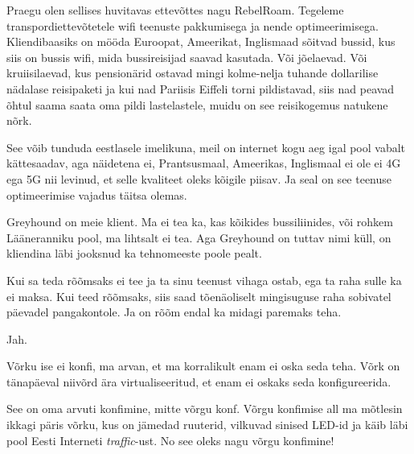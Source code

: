 
Praegu olen sellises huvitavas ettevõttes nagu RebelRoam. Tegeleme transpordiettevõtetele wifi teenuste pakkumisega ja nende optimeerimisega. Kliendibaasiks on mööda Euroopat, Ameerikat, Inglismaad sõitvad bussid, kus siis on bussis wifi, mida  bussireisijad saavad kasutada. Või jõelaevad. Või kruiisilaevad, kus pensionärid ostavad mingi kolme-nelja tuhande dollarilise nädalase reisipaketi ja kui nad Pariisis Eiffeli torni pildistavad, siis nad peavad õhtul saama saata oma pildi lastelastele, muidu on see reisikogemus natukene nõrk. 

See võib tunduda  eestlasele imelikuna, meil on internet kogu aeg igal pool vabalt kättesaadav, aga näidetena ei, Prantsusmaal, Ameerikas, Inglismaal ei ole ei 4G ega 5G nii levinud, et selle kvaliteet oleks kõigile piisav. Ja seal on see teenuse optimeerimise vajadus täitsa olemas.


Greyhound on meie klient. Ma ei tea ka, kas kõikides bussiliinides, või rohkem Lääneranniku pool, ma lihtsalt ei tea. Aga Greyhound on tuttav nimi küll,  on kliendina läbi jooksnud ka tehnomeeste poole pealt.


Kui sa teda rõõmsaks ei tee ja ta sinu teenust vihaga ostab, ega  ta raha sulle ka ei maksa. Kui teed rõõmsaks, siis saad tõenäoliselt mingisuguse raha sobivatel päevadel pangakontole. Ja on rõõm endal ka midagi paremaks teha.


Jah.


Võrku ise ei konfi, ma arvan, et ma korralikult enam ei oska seda teha. Võrk on tänapäeval  niivõrd ära virtualiseeritud, et enam ei oskaks seda konfigureerida.


See on oma arvuti konfimine, mitte võrgu konf. Võrgu konfimise all ma mõtlesin ikkagi päris võrku, kus on jämedad ruuterid, vilkuvad sinised LED-id ja käib läbi pool Eesti Interneti \emph{traffic}-ust. No see oleks nagu võrgu konfimine! 


